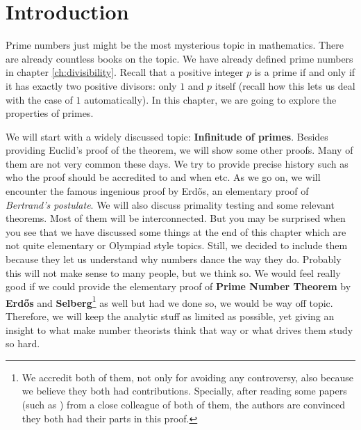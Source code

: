 \documentclass{subfiles}
\begin{document}
\section{Introduction}
	Prime numbers just might be the most mysterious topic in mathematics. There are already countless books on the topic. We have already defined prime numbers in chapter \eqref{ch:divisibility}. Recall that a positive integer $p$ is a prime if and only if it has exactly two positive divisors: only $1$ and $p$ itself (recall how this lets us deal with the case of $1$ automatically). In this chapter, we are going to explore the properties of primes\watermark.
	
	We will start with a widely discussed topic: \textbf{Infinitude of primes}. Besides providing Euclid's proof of the theorem, we will show some other proofs. Many of them are not very common these days. We try to provide precise history such as who the proof should be accredited to and when etc. As we go on, we will encounter the famous ingenious proof by Erd\H{o}s, an elementary proof of \textit{Bertrand's postulate}. We will also discuss primality testing and some relevant theorems. Most of them will be interconnected. But you may be surprised when you see that we have discussed some things at the end of this chapter which are not quite elementary or Olympiad style topics. Still, we decided to include them because they let us understand why numbers dance the way they do. Probably this will not make sense to many people, but we think so. We would feel really good if we could provide the elementary proof of \textbf{Prime Number Theorem} by \textbf{Erd\H{o}s} and \textbf{Selberg}\footnote{We accredit both of them, not only for avoiding any controversy, also because we believe they both had contributions. Specially, after reading some papers (such as \cite{baas}) from a close colleague of both of them, the authors are convinced they both had their parts in this proof.} as well but had we done so, we would be way off topic. Therefore, we will keep the analytic stuff as limited as possible, yet giving an insight to what make number theorists think that way or what drives them study so hard.
	
\end{document}
